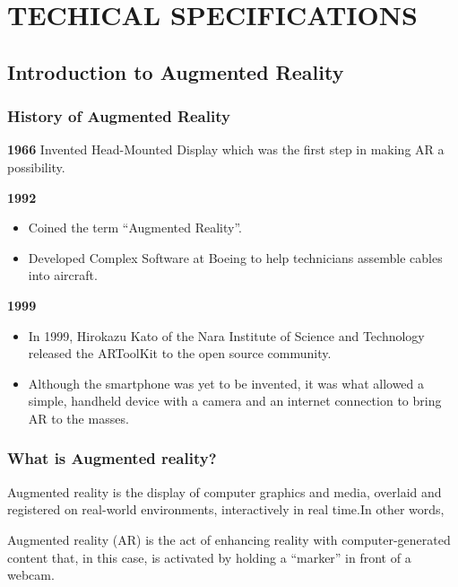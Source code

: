\documentclass{article}
\begin{document}

\newpage
\section{TECHICAL SPECIFICATIONS}

\subsection{Introduction to Augmented Reality }

\subsubsection{History of Augmented Reality}
\par \textbf{1966} Invented Head-Mounted Display which was the first step in making AR a possibility.
\par \textbf{1992}
\begin{itemize}
\item Coined the term “Augmented Reality”.
\item Developed Complex Software at Boeing  to help technicians assemble cables into aircraft.
\end{itemize}

\par \textbf{1999}
\begin{itemize}
\item In 1999, Hirokazu Kato of the Nara Institute of Science and Technology released the ARToolKit to the open source community.
\item Although the smartphone was yet to be invented, it was what allowed a simple, handheld device with a camera and an internet connection to bring AR to the masses.
\end{itemize}


\subsubsection{What is Augmented reality? }
\par Augmented reality is the display of computer graphics and media, overlaid and registered on real-world environments, interactively in real time.\small{In other words,}
\par Augmented reality (AR) is the act of enhancing reality with computer-generated content that, in this case, is activated by holding a “marker” in front of a webcam.
\end{document}
